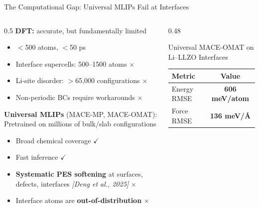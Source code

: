 \documentclass[aspectratio=169,10pt]{beamer}
\newcommand{\badtext}[1]{\textcolor{badcolor}{\textbf{#1}}}
\newcommand{\cmark}{\textcolor{wincolor}{$\checkmark$}}
\newcommand{\xmark}{\textcolor{badcolor}{$\times$}}
\begin{document}
\begin{frame}{The Computational Gap: Universal MLIPs Fail at Interfaces}
\begin{columns}[T]
  \begin{column}{0.5\textwidth}
    \textbf{DFT:} accurate, but fundamentally limited
    \begin{itemize}
      \item $<$500 atoms, $<$50 ps
      \item Interface supercells: 500--1500 atoms \xmark
      \item Li-site disorder: $>$65,000 configurations \xmark
      \item Non-periodic BCs require workarounds \xmark
    \end{itemize}

    \vspace{0.5em}
    \textbf{Universal MLIPs} (MACE-MP, MACE-OMAT):\\
    Pretrained on millions of bulk/slab configurations
    \begin{itemize}
      \item Broad chemical coverage \cmark
      \item Fast inference \cmark
      \item \badtext{Systematic PES softening} at surfaces,
        defects, interfaces \textit{[Deng et al., 2025]} \xmark
      \item Interface atoms are \badtext{out-of-distribution} \xmark
    \end{itemize}
  \end{column}
  \begin{column}{0.48\textwidth}
    \begin{alertblock}{Universal MACE-OMAT on Li--LLZO Interfaces}
      \centering\vspace{0.2em}
      \begin{tabular}{lc}
        \toprule
        Metric & Value \\
        \midrule
        Energy RMSE & \badtext{606 meV/atom} \\
        Force RMSE  & \badtext{136 meV/\AA} \\
        \bottomrule
      \end{tabular}\vspace{0.2em}
    \end{alertblock}


\end{column}
\end{columns}
\end{frame}
\end{document}

